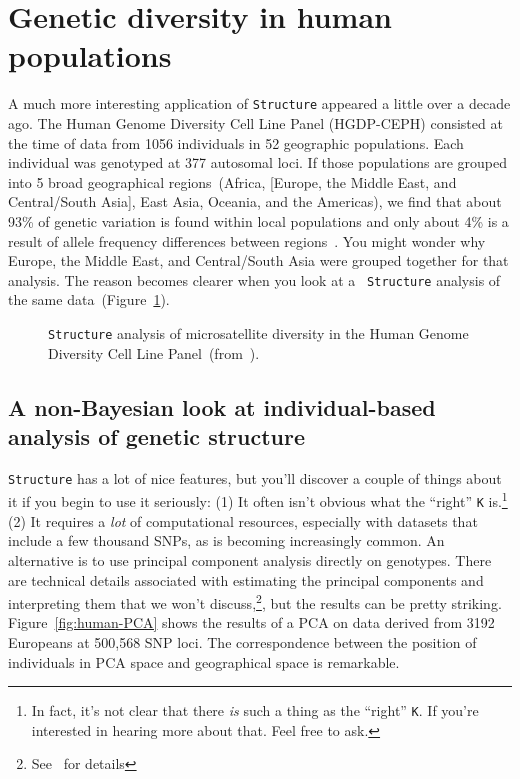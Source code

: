 \documentclass[12pt]{article}
\begin{document}
\section*{Genetic diversity in human populations}

A much more interesting application of {\tt Structure} appeared a
little over a decade ago. The Human Genome Diversity Cell Line Panel
(HGDP-CEPH) consisted at the time of data from 1056
individuals in 52 geographic populations. Each individual was
genotyped at 377 autosomal loci. If those populations are grouped into
5 broad geographical regions~(Africa, [Europe, the Middle East, and
Central/South Asia], East Asia, Oceania, and the Americas), we find
that about 93\% of genetic variation is found within local populations
and only about 4\% is a result of allele frequency differences between
regions~\cite{Rosenberg-etal-2002}. You might wonder why Europe, the
Middle East, and Central/South Asia were grouped together for that
analysis. The reason becomes clearer when you look at a {\tt
  Structure} analysis of the same data~(Figure~\ref{fig:HGDP-CEPH}).

\begin{figure}
\caption{{\tt Structure} analysis of microsatellite diversity in the
  Human Genome Diversity Cell Line
  Panel~(from~\cite{Rosenberg-etal-2002}).}\label{fig:HGDP-CEPH} 
\end{figure}

\subsection*{A non-Bayesian look at individual-based analysis of
  genetic structure}

{\tt Structure} has a lot of nice features, but you'll discover a
couple of things about it if you begin to use it seriously: (1) It
often isn't obvious what the ``right'' {\tt K} is.\footnote{In fact,
  it's not clear that there {\it is\/} such a thing as the ``right''
  {\tt K}. If you're interested in hearing more about that. Feel free
  to ask.} (2) It requires a {\it lot\/} of computational resources,
especially with datasets that include a few thousand SNPs, as is
becoming increasingly common. An alternative is to use principal
component analysis directly on genotypes. There are technical details
associated with estimating the principal components and interpreting
them that we won't discuss,\footnote{See~\cite{Novembre-Stephens-2008}
  for details}, but the results can be pretty
striking. Figure~\ref{fig:human-PCA} shows the results of a PCA on
data derived from 3192 Europeans at 500,568 SNP loci. The
correspondence between the position of individuals in PCA space and
geographical space is remarkable.
\end{document}
